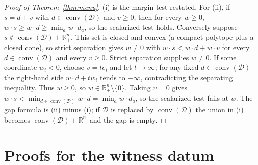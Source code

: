 \documentclass[preprint,11pt,authoryear]{elsarticle}
\theoremstyle{definition}
\theoremstyle{remark}
\newcommand{\conv}{\operatorname{conv}}
\newcommand{\Rp}{\mathbb{R}^n_+}
\begin{document}
\begin{proof}[Proof of Theorem~\ref{thm:menu}]
(i) is the margin test restated. For (ii), if $s=d+v$ with $d\in\conv(\mathcal D)$ and $v\ge0$, then for every $w\ge0$, $w\cdot s\ge w\cdot d\ge\min_aw\cdot d_a$, so the scalarized test holds. Conversely suppose $s\notin\conv(\mathcal D)+\Rp$. This set is closed and convex (a compact polytope plus a closed cone), so strict separation gives $w\ne0$ with $w\cdot s<w\cdot d+w\cdot v$ for every $d\in\conv(\mathcal D)$ and every $v\ge0$. Strict separation supplies $w\ne0$. If some coordinate $w_i<0$, choose $v=t e_i$ and let $t\to\infty$; for any fixed $d\in\conv(\mathcal D)$ the right-hand side $w\cdot d+t w_i$ tends to $-\infty$, contradicting the separating inequality. Thus $w\ge0$, so $w\in\Rp\setminus\{0\}$. Taking $v=0$ gives $w\cdot s<\min_{d\in\conv(\mathcal D)}w\cdot d=\min_aw\cdot d_a$, so the scalarized test fails at $w$. The gap formula is (ii) minus (i); if $\mathcal D$ is replaced by $\conv(\mathcal D)$ the union in (i) becomes $\conv(\mathcal D)+\Rp$ and the gap is empty.
\end{proof}

\section{Proofs for the witness datum}\label{app:witness}
\end{document}
